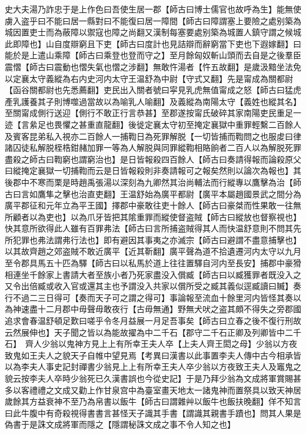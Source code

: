 史大夫湯乃詐忠于是上作色曰吾使生居一郡【師古曰博士儒官也故呼為生】能無使虜入盗乎曰不能曰居一縣對曰不能復曰居一障間【師古曰障謂塞上要險之處别築為城因置吏士而為蔽障以禦寇也障之尚翻又漢制每塞要處别築為城置人鎮守謂之候城此即障也】山自度辯窮且下吏【師古曰度計也見詰辯而辭窮當下吏也下遐嫁翻】曰能於是上遣山乘障【師古曰乘登也登而守之】至月餘匈奴斬山頭而去自是之後羣臣震慴【師古曰震動也慴失氣也慴之涉翻】無敢忤湯者【忤五故翻】是歲汲黯坐法免以定襄太守義縱為右内史河内太守王温舒為中尉【守式又翻】先是甯成為關都尉【函谷關都尉也先悉薦翻】吏民出入關者號曰寜見乳虎無值甯成之怒【師古曰猛虎產乳護養其子則博噬過當故以為喻乳人喻翻】及義縱為南陽太守【義姓也縱其名】至關甯成側行送迎【側行不敢正行言恭甚】至郡遂按甯氏破碎其家南陽吏民重足一迹【言絫足也畏懼之甚重直龍翻】後徙定襄太守初至掩定襄獄中重罪輕繫二百餘人及賓客昆弟私入視亦二百餘人一捕鞫日為死罪解脱【一切皆捕而鞫問之也服䖍曰律諸囚徒私解脱桎梏鉗赭加罪一等為人解脱與同罪縱鞫相賂餉者二百人以為解脱死罪盡殺之師古曰鞫窮也謂窮治也】是日皆報殺四百餘人【師古曰奏請得報而論殺原父曰縱掩定襄獄一切捕鞫而云是日皆報殺則非奏請報可之報矣然則以論次為報也】其後郡中不寒而栗是時趙禹張湯以深刻為九卿然其治尚輔法而行縱專以鷹擊為治【師古曰言如鷹隼之擊也治直吏翻】王温舒始為廣平都尉【廣平本屬趙國景武之間分為廣平郡征和元年立為平王國】擇郡中豪敢往吏十餘人【師古曰豪桀而性果敢一往無所顧者以為吏也】以為爪牙皆把其隂重罪而縱使督盗賊【師古曰縱放也督察視也】快其意所欲得此人雖有百罪弗法【師古曰言所捕盗賊得其人而快温舒意則不問其先所犯罪也弗法謂弗行法也】即有避因其事夷之亦滅宗【師古曰避謂不盡意捕擊也】以其故齊趙之郊盗賊不敢近廣平【近其靳翻】廣平聲為道不拾遺遷河内太守以九月至令郡具馬五十匹為驛【師古曰以私馬於道上往往置驛自河内至長安】捕郡中豪猾相連坐千餘家上書請大者至族小者乃死家盡没入償臧【師古曰以臧獲罪者既没入之又令出倍臧或收入官或還其主也予謂没入共家以償所受之臧其義似逕臧讀曰贓】奏行不過二三日得可【奏而天子可之謂之得可】事論報至流血十餘里河内皆怪其奏以為神速盡十二月郡中毋聲毋敢夜行【古毋無通】野無犬吠之盗其頗不得失之旁郡國追求會春温舒頓足歎曰嗟乎令冬月益展一月足吾事矣【師古曰立春之後不復行刑故云然展伸也】天子聞之皆以為能故擢為中二千石【郡守二千石正卿及列卿皆中二千石】　齊人少翁以鬼神方見上上有所幸王夫人卒【上夫人齊王閎之母】少翁以方夜致鬼如王夫人之貌天子自帷中望見焉【考異曰漢書以此事置李夫人傳中古今相承皆以為李夫人事史記封禪書少翁見上上有所幸王夫人卒少翁以方夜致王夫人及竈鬼之貌云按李夫人卒時少翁死已久漢書誤也今從史記】于是乃拜少翁為文成將軍賞賜甚多以客禮禮之文成又勸上作甘泉宫中為臺室畫天地太一諸鬼神而置祭具以致天神居歲餘其方益衰神不至乃為帛書以飯牛【師古曰謂雜艸以飯牛也飯扶晚翻】佯不知言曰此牛腹中有奇殺視得書書言甚怪天子識其手書【謂識其親書手蹟也】問其人果是偽書于是誅文成將軍而隱之【隱謂秘誅文成之事不令人知之也】

